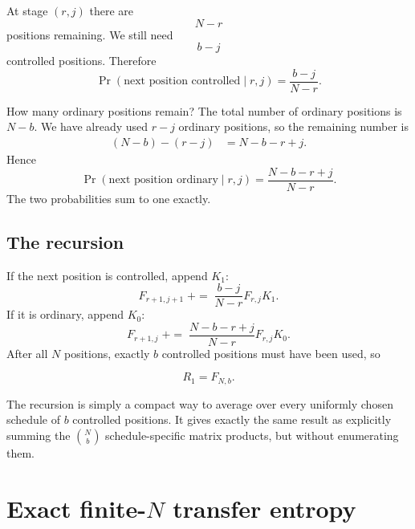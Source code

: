 \documentclass[11pt,a4paper]{article}
\newcommand{\Prb}{\operatorname{Pr}}
\newcommand{\1}{\mathbbm{1}}
\begin{document}
At stage $(r,j)$ there are
\[
N-r
\]
positions remaining. We still need
\[
b-j
\]
controlled positions. Therefore
\begin{equation}
\Prb(\text{next position controlled}\mid r,j)
=
\frac{b-j}{N-r}.
\label{eq:pnextctrl}
\end{equation}

How many ordinary positions remain? The total number of ordinary positions is $N-b$. We have already used $r-j$ ordinary positions, so the remaining number is
\begin{align}
(N-b)-(r-j)
&=N-b-r+j.
\end{align}
Hence
\begin{equation}
\Prb(\text{next position ordinary}\mid r,j)
=
\frac{N-b-r+j}{N-r}.
\label{eq:pnextordinary}
\end{equation}
The two probabilities sum to one exactly.

\subsection{The recursion}

If the next position is controlled, append $K_1$:
\begin{equation}
F_{r+1,j+1}
\;{+}{=}\;
\frac{b-j}{N-r}F_{r,j}K_1.
\label{eq:Fctrl}
\end{equation}
If it is ordinary, append $K_0$:
\begin{equation}
F_{r+1,j}
\;{+}{=}\;
\frac{N-b-r+j}{N-r}F_{r,j}K_0.
\label{eq:Ford}
\end{equation}
After all $N$ positions, exactly $b$ controlled positions must have been used, so
\begin{resultbox}
\begin{equation}
\boxed{R_1=F_{N,b}.}
\label{eq:R1}
\end{equation}
\end{resultbox}

\begin{logicbox}
The recursion is simply a compact way to average over every uniformly chosen schedule of $b$ controlled positions. It gives exactly the same result as explicitly summing the $\binom{N}{b}$ schedule-specific matrix products, but without enumerating them.
\end{logicbox}

\section{Exact finite-$N$ transfer entropy}
\end{document}

